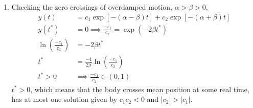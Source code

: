 \begin{enumerate}
    \item Checking the zero crossings of overdamped motion, $ \alpha > \beta > 0 $,
          \begin{align}
              y(t)      & = c_{1}\exp\left[ -(\alpha - \beta)t \right]
              + c_{2}\exp\left[ -(\alpha + \beta)t \right]                           \\
              y(t^{*})  & = 0 \implies \frac{-c_{1}}{c_{2}} = \exp(-2\beta t^{*})    \\
              \ln \left( \frac{-c_{1}}{c_{2}} \right)
                        & = -2\beta t^{*}                                            \\
              t^{*}     & =\frac{-1}{2\beta} \ln \left( \frac{-c_{1}}{c_{2}} \right) \\
              t^{*} > 0 & \implies \frac{-c_{1}}{c_{2}} \in (0, 1)
          \end{align}
          $ t^{*} > 0 $, which means that the body crosses mean position at some real
          time, has at most one solution given by
          $ c_{1}c_{2} < 0 $ and $ |c_{2}| > |c_{1}| $.


\end{enumerate}
